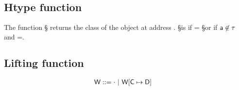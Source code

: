 \documentclass[a4paper,USenglish]{tex/lipics-v2016}
\begin{document}
\subsection{Htype function}

The function \htype\a\S\s\K
returns the class of the object at address \a.  \htype\a\S\s\K is \C if \C =
\App\S\a or if $\a\not\in\S$ and \obj\C{\b\a}=\App\s\a.

\begin{mathpar}

\end{mathpar}

\subsection{Lifting function}

\begin{align*}
\W &::= \cdot \B \Map\W{\Bind\C\D}
\end{align*}
\begin{mathpar}


\end{mathpar}
\\

\end{document}

